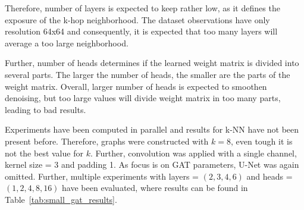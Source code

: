 Therefore, number of layers is expected to keep rather low, as it defines the exposure of the k-hop neighborhood.
The dataset observations have only resolution 64x64 and consequently, it is expected that too many layers will 
average a too large neighborhood.

Further, number of heads determines if the learned weight matrix is divided into several parts.
The larger the number of heads, the smaller are the parts of the weight matrix.
Overall, larger number of heads is expected to smoothen denoising, but too large values
will divide weight matrix in too many parts, leading to bad results.

Experiments have been computed in parallel and results for k-NN have not been present before. 
Therefore, graphs were constructed with $k=8$, even tough it is not the best value for $k$.
Further, convolution was applied with a single channel, kernel size = 3 and padding 1.
As focus is on GAT parameters, U-Net was again omitted.
Further, multiple experiments with layers = $(2,3,4,6)$ and heads = $(1,2,4,8,16)$ have been evaluated, 
where results can be found in Table~\ref{tab:small_gat_results}.

